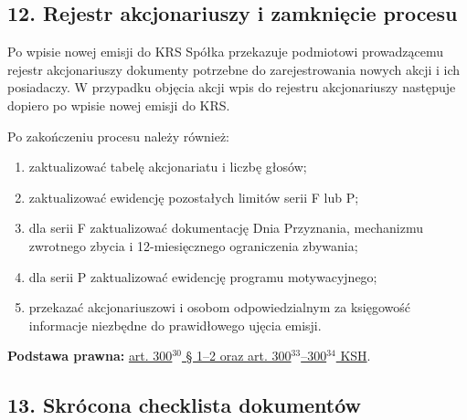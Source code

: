 \documentclass[12pt,a4paper]{report}
\begin{document}
\subsection*{12. Rejestr akcjonariuszy i zamknięcie procesu}

Po wpisie nowej emisji do KRS Spółka przekazuje podmiotowi prowadzącemu rejestr akcjonariuszy dokumenty potrzebne do zarejestrowania nowych akcji i ich posiadaczy. W przypadku objęcia akcji wpis do rejestru akcjonariuszy następuje dopiero po wpisie nowej emisji do KRS.

Po zakończeniu procesu należy również:
\begin{enumerate}
  \item zaktualizować tabelę akcjonariatu i liczbę głosów;
  \item zaktualizować ewidencję pozostałych limitów serii F lub P;
  \item dla serii F zaktualizować dokumentację Dnia Przyznania, mechanizmu zwrotnego zbycia i 12-miesięcznego ograniczenia zbywania;
  \item dla serii P zaktualizować ewidencję programu motywacyjnego;
  \item przekazać akcjonariuszowi i osobom odpowiedzialnym za księgowość informacje niezbędne do prawidłowego ujęcia emisji.
\end{enumerate}

\textbf{Podstawa prawna:} \href{https://eli.gov.pl/api/acts/DU/2024/18/text.html}{art. 300$^{30}$ § 1--2 oraz art. 300$^{33}$--300$^{34}$ KSH}.

\subsection*{13. Skrócona checklista dokumentów}
\end{document}
